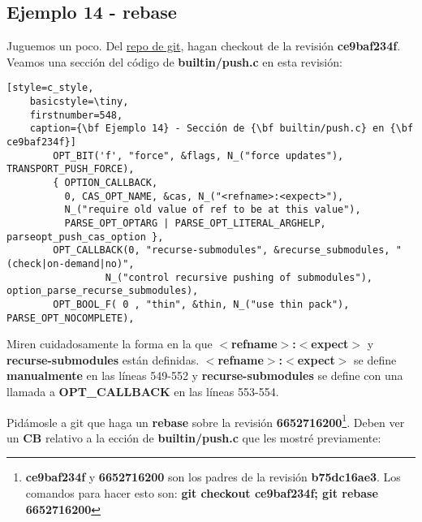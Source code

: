 \subsection{Ejemplo 14 - rebase}

Juguemos un poco. Del \hyperref[git_repo]{repo de git}, hagan checkout de la revisión {\bf ce9baf234f}. Veamos una sección
del código de {\bf builtin/push.c} en esta revisión:

\begin{lstlisting}[style=c_style,
	basicstyle=\tiny,
	firstnumber=548,
	caption={\bf Ejemplo 14} - Sección de {\bf builtin/push.c} en {\bf ce9baf234f}]
		OPT_BIT('f', "force", &flags, N_("force updates"), TRANSPORT_PUSH_FORCE),
		{ OPTION_CALLBACK,
		  0, CAS_OPT_NAME, &cas, N_("<refname>:<expect>"),
		  N_("require old value of ref to be at this value"),
		  PARSE_OPT_OPTARG | PARSE_OPT_LITERAL_ARGHELP, parseopt_push_cas_option },
		OPT_CALLBACK(0, "recurse-submodules", &recurse_submodules, "(check|on-demand|no)",
			     N_("control recursive pushing of submodules"), option_parse_recurse_submodules),
		OPT_BOOL_F( 0 , "thin", &thin, N_("use thin pack"), PARSE_OPT_NOCOMPLETE),
\end{lstlisting}

Miren cuidadosamente la forma en la que {\bf $<$refname$>$:$<$expect$>$} y {\bf recurse-submodules} están definidas.
{\bf $<$refname$>$:$<$expect$>$} se define {\bf manualmente} en las líneas 549-552 y {\bf recurse-submodules} se define
con una llamada a {\bf OPT\_CALLBACK} en las líneas 553-554.

Pidámosle a git que haga un {\bf rebase} sobre la revisión {\bf 6652716200}\footnote{{\bf ce9baf234f} y {\bf 6652716200}
son los padres de la revisión {\bf b75dc16ae3}. Los comandos para hacer esto son: {\bf git checkout ce9baf234f; git rebase 6652716200}}.
Deben ver un {\bf CB} relativo a la ección de {\bf builtin/push.c} que les mostré previamente:

